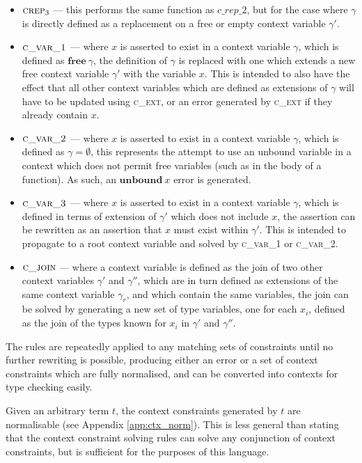 \documentclass[preprint]{sigplanconf}
\newcommand{\appref}[1]{Appendix \ref{#1}}
\newcommand{\free}[1]{\mathbf{free}\:#1}
\begin{document}
\begin{itemize}
\item $\textsc{crep}_3$ --- this performs the same function as
$c\_rep\_2$, but for the case where $\gamma$ is directly defined as
a replacement on a free or empty context variable $\gamma'$.

\item $\textsc{c\_var\_1}$ --- where $x$ is asserted to exist in a context
variable $\gamma$, which is defined as $\free{\gamma}$, the definition
of $\gamma$ is replaced with one which extends a new free context variable
$\gamma'$ with the variable $x$. This is intended to also have the effect
that all other context variables which are defined as extensions of 
$\gamma$ will have to be updated using \textsc{c\_ext}, or an error
generated by \textsc{c\_ext} if they already contain $x$.

\item $\textsc{c\_var\_2}$ --- where $x$ is asserted to exist in a
context variable $\gamma$, which is defined as $\gamma = \emptyset$, this
represents the attempt to use an unbound variable in a context which does
not permit free variables (such as in the body of a function). As such,
an $\mathbf{unbound}\:x$ error is generated.

\item $\textsc{c\_var\_3}$ --- where $x$ is asserted to exist
in a context variable $\gamma$, which is defined in terms of
extension of $\gamma'$ which does not include $x$, the assertion
can be rewritten as an assertion that $x$ must exist within $\gamma'$.
This is intended to propagate to a root context variable and solved
by \textsc{c\_var\_1} or \textsc{c\_var\_2}.

\item $\textsc{c\_join}$ --- where a context variable is defined as the
join of two other context variables $\gamma'$ and $\gamma''$, which are in turn defined as extensions
of the same context variable $\gamma_r$, and which contain the same variables,
the join can be solved by generating a new set of type variables, one for
each $x_i$, defined as the join of the types known for $x_i$ in $\gamma'$
and $\gamma''$.
\end{itemize}

The rules are repeatedly applied to any matching sets of constraints
until no further rewriting is possible, producing either an error
or a set of context constraints which are fully normalised, and
can be converted into contexts for type checking easily.

Given an arbitrary term $t$, the context constraints generated by $t$
are normalisable (see \appref{app:ctx_norm}).
This is less general than stating that the context constraint solving rules
can solve any conjunction of context constraints, but is sufficient for
the purposes of this language.
\end{document}
